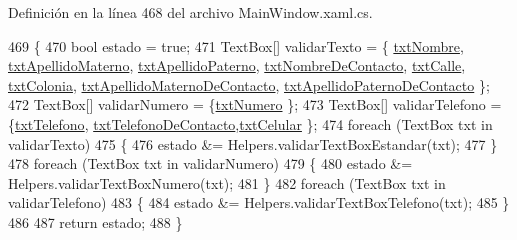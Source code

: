 Definición en la línea 468 del archivo Main\-Window.\-xaml.\-cs.


\begin{DoxyCode}
469         \{
470             \textcolor{keywordtype}{bool} estado = \textcolor{keyword}{true};
471             TextBox[] validarTexto = \{ \hyperlink{class_proyecto___integrador__3_1_1_main_window_a66650387b40eb348806d9692d163e03a}{txtNombre}, \hyperlink{class_proyecto___integrador__3_1_1_main_window_ad6d2f2927d00f63954e85d4609c9c2b6}{txtApellidoMaterno}, 
      \hyperlink{class_proyecto___integrador__3_1_1_main_window_a84bcf28ad1df8514c1b1646ab9a62513}{txtApellidoPaterno}, \hyperlink{class_proyecto___integrador__3_1_1_main_window_afe7d51ab07d58ba85a31a58fce6f7d34}{txtNombreDeContacto}, 
      \hyperlink{class_proyecto___integrador__3_1_1_main_window_afbbf986bc8047e3cade1e2ab50a1402c}{txtCalle}, \hyperlink{class_proyecto___integrador__3_1_1_main_window_a3c03dcfb84d69ba923dcc7d54d98c569}{txtColonia}, \hyperlink{class_proyecto___integrador__3_1_1_main_window_a3fc9dd11451712b3345df9f7a471d9b7}{txtApellidoMaternoDeContacto}, 
      \hyperlink{class_proyecto___integrador__3_1_1_main_window_ad353fe2247d841495434638ca24cf97c}{txtApellidoPaternoDeContacto} \};
472             TextBox[] validarNumero = \{\hyperlink{class_proyecto___integrador__3_1_1_main_window_aa5f2bae20c9397b7c6ea3926afebd5ce}{txtNumero} \};
473             TextBox[] validarTelefono = \{\hyperlink{class_proyecto___integrador__3_1_1_main_window_a3d79de440d7968c622d331dd467c8987}{txtTelefono},
      \hyperlink{class_proyecto___integrador__3_1_1_main_window_a0103b8eb21ee11204623d0f08a6acdaf}{txtTelefonoDeContacto},\hyperlink{class_proyecto___integrador__3_1_1_main_window_ac9cc63316a297453b50f4b8704503109}{txtCelular} \};
474             \textcolor{keywordflow}{foreach} (TextBox txt \textcolor{keywordflow}{in} validarTexto)
475             \{
476                 estado &= Helpers.validarTextBoxEstandar(txt);
477             \}
478             \textcolor{keywordflow}{foreach} (TextBox txt \textcolor{keywordflow}{in} validarNumero)
479             \{
480                 estado &= Helpers.validarTextBoxNumero(txt);
481             \}
482             \textcolor{keywordflow}{foreach} (TextBox txt \textcolor{keywordflow}{in} validarTelefono)
483             \{
484                 estado &= Helpers.validarTextBoxTelefono(txt);
485             \}
486             
487             \textcolor{keywordflow}{return} estado;
488         \}
\end{DoxyCode}


